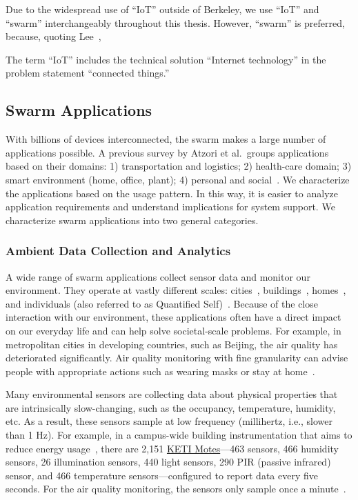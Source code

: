 Due to the widespread use of ``IoT'' outside of Berkeley, we use ``IoT'' and
``swarm'' interchangeably throughout this thesis. However, ``swarm'' is
preferred, because, quoting Lee~\cite{lee2016iot},

\begin{displayquote}
  The term ``IoT'' includes the technical solution ``Internet technology'' in
  the problem statement ``connected things.''
\end{displayquote}

\subsection{Swarm Applications}
\label{sec:swarm-applications}

With billions of devices interconnected, the swarm makes a large number of
applications possible. A previous survey by Atzori et al.\, groups applications
based on their domains: 1) transportation and logistics; 2) health-care domain;
3) smart environment (home, office, plant); 4) personal and
social~\cite{atzori2010internet}. We characterize the applications based on the
usage pattern. In this way, it is easier to analyze application requirements and
understand implications for system support. We characterize swarm applications
into two general categories.

\subsubsection{Ambient Data Collection and Analytics}
\label{sec:ambi-data-coll}

A wide range of swarm applications collect sensor data and monitor our
environment. They operate at vastly different scales:
cities~\cite{cheng2014aircloud, sfpark}, buildings~\cite{dawson2010smap},
homes~\cite{hnat2011hitchhiker}, and individuals (also referred to as Quantified
Self)~\cite{fitbit, swan2013quantified}. Because of the close interaction with
our environment, these applications often have a direct impact on our everyday
life and can help solve societal-scale problems. For example, in metropolitan
cities in developing countries, such as Beijing, the air quality has
deteriorated significantly. Air quality monitoring with fine granularity can
advise people with appropriate actions such as wearing masks or stay at
home~\cite{cheng2014aircloud}.

Many environmental sensors are collecting data about physical properties that
are intrinsically slow-changing, such as the occupancy, temperature, humidity,
etc. As a result, these sensors sample at low frequency (millihertz, i.e.,
slower than 1 Hz). For example, in a campus-wide building instrumentation that
aims to reduce energy usage~\cite{krioukov2012building}, there are 2,151
\href{http://www.keti.re.kr/}{KETI Motes}---463  sensors, 466 humidity
sensors, 26 illumination sensors, 440 light sensors, 290 PIR (passive infrared)
sensor, and 466 temperature sensors---configured to report data every five
seconds. For the air quality monitoring, the sensors only sample once a
minute~\cite{cheng2014aircloud}.

